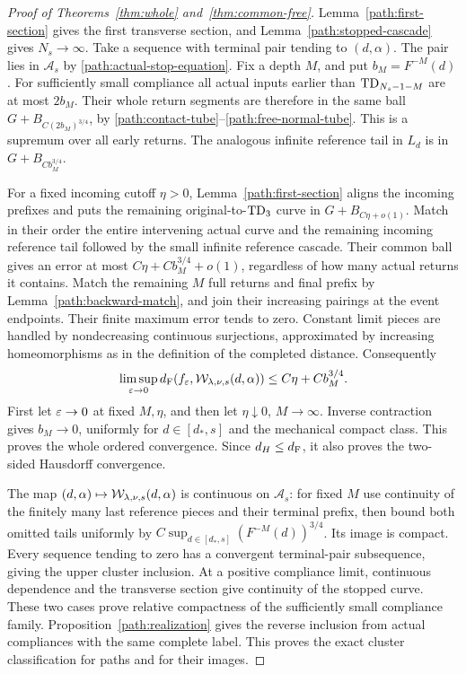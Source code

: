 \begin{proof}[Proof of Theorems~\ref{thm:whole} and~\ref{thm:common-free}]
Lemma~\ref{path:first-section} gives the first transverse section,
and Lemma~\ref{path:stopped-cascade} gives $N_s\to\infty$.
Take a sequence with terminal pair tending to $(d,\alpha)$.
The pair lies in $\mathcal A_s$ by
\eqref{path:actual-stop-equation}.  Fix a depth $M$, and put
$b_M=F^{-M}(d)$.  For sufficiently small compliance all actual
inputs earlier than $\mathrm{TD}_{N_s-1-M}$ are at most $2b_M$.
Their whole return segments are therefore in the same ball
$G+B_{C(2b_M)^{3/4}}$, by
\eqref{path:contact-tube}--\eqref{path:free-normal-tube}.
This is a supremum over all early returns.  The analogous infinite
reference tail in $L_d$ is in $G+B_{Cb_M^{3/4}}$.

For a fixed incoming cutoff $\eta>0$,
Lemma~\ref{path:first-section} aligns the incoming prefixes and puts
the remaining original-to-$\mathrm{TD}_3$ curve in
$G+B_{C\eta+o(1)}$.  Match in their order the entire intervening
actual curve and the remaining incoming reference tail followed
by the small infinite reference cascade.  Their common ball gives
an error at most $C\eta+Cb_M^{3/4}+o(1)$, regardless of how many
actual returns it contains.  Match the remaining $M$ full returns
and final prefix by Lemma~\ref{path:backward-match}, and join
their increasing pairings at the event endpoints.  Their finite
maximum error tends to zero.  Constant limit pieces are handled by
nondecreasing continuous surjections, approximated by increasing
homeomorphisms as in the definition of the completed distance.
Consequently
\begin{equation}
 \limsup_{\varepsilon\to0}d_{\mathrm F}(f_\varepsilon,
                  \mathcal W_{\lambda,\nu,s}(d,\alpha))
                         \le C\eta+Cb_M^{3/4}.
 \label{path:whole-error}
\end{equation}
First let $\varepsilon\to0$ at fixed $M,\eta$, and then let
$\eta\downarrow0$, $M\to\infty$.  Inverse contraction gives
$b_M\to0$, uniformly for $d\in[d_*,s]$ and the mechanical compact
class.  This proves the whole ordered convergence.  Since
$d_H\le d_{\mathrm F}$, it also proves the two-sided Hausdorff convergence.

The map $(d,\alpha)\mapsto\mathcal W_{\lambda,\nu,s}(d,\alpha)$ is
continuous on $\mathcal A_s$: for fixed $M$ use continuity of the
finitely many last reference pieces and their terminal prefix,
then bound both omitted tails uniformly by
$C\sup_{d\in[d_*,s]}(F^{-M}(d))^{3/4}$.  Its image is compact.
Every sequence tending to zero has a convergent terminal-pair
subsequence, giving the upper cluster inclusion.  At a positive
compliance limit, continuous dependence and the transverse section
give continuity of the stopped curve.  These two cases prove
relative compactness of the sufficiently small compliance family.
Proposition~\ref{path:realization} gives the reverse inclusion from
actual compliances with the same complete label.  This proves
the exact cluster classification for paths and for their images.


\end{proof}
